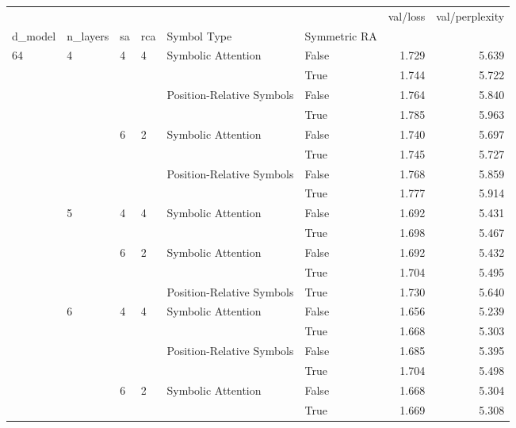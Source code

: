 \begin{tabular}{llllllrr}
\toprule
    &   &   &   &                    &       &  val/loss &  val/perplexity \\
d\_model & n\_layers & sa & rca & Symbol Type & Symmetric RA &           &                 \\
\midrule
64  & 4 & 4 & 4 & Symbolic Attention & False &     1.729 &           5.639 \\
    &   &   &   &                    & True  &     1.744 &           5.722 \\
    &   &   &   & Position-Relative Symbols & False &     1.764 &           5.840 \\
    &   &   &   &                    & True  &     1.785 &           5.963 \\
    &   & 6 & 2 & Symbolic Attention & False &     1.740 &           5.697 \\
    &   &   &   &                    & True  &     1.745 &           5.727 \\
    &   &   &   & Position-Relative Symbols & False &     1.768 &           5.859 \\
    &   &   &   &                    & True  &     1.777 &           5.914 \\
    & 5 & 4 & 4 & Symbolic Attention & False &     1.692 &           5.431 \\
    &   &   &   &                    & True  &     1.698 &           5.467 \\
    &   & 6 & 2 & Symbolic Attention & False &     1.692 &           5.432 \\
    &   &   &   &                    & True  &     1.704 &           5.495 \\
    &   &   &   & Position-Relative Symbols & True  &     1.730 &           5.640 \\
    & 6 & 4 & 4 & Symbolic Attention & False &     1.656 &           5.239 \\
    &   &   &   &                    & True  &     1.668 &           5.303 \\
    &   &   &   & Position-Relative Symbols & False &     1.685 &           5.395 \\
    &   &   &   &                    & True  &     1.704 &           5.498 \\
    &   & 6 & 2 & Symbolic Attention & False &     1.668 &           5.304 \\
    &   &   &   &                    & True  &     1.669 &           5.308 \\

\end{tabular}
